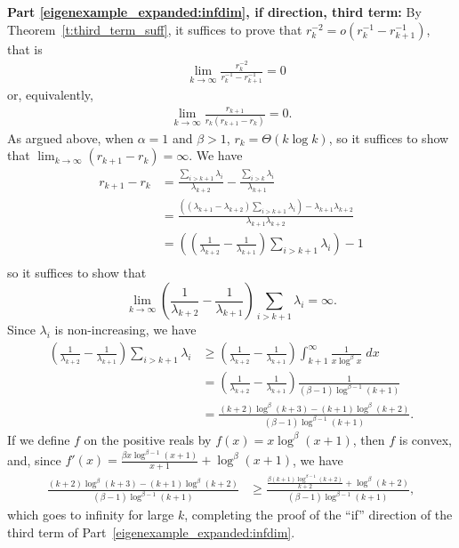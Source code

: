 \documentclass[11pt,notitlepage]{article}
\begin{document}
\noindent
{\bf Part \ref{eigenexample_expanded:infdim}, if direction, third term:}  By Theorem~\ref{t:third_term_suff}, it suffices to
prove that $r_k^{-2} = o(r_k^{-1} - r_{k+1}^{-1})$, that is
\begin{align*}
& \lim_{k \rightarrow \infty} 
 \frac{r_k^{-2}}{r_k^{-1} - r_{k+1}^{-1}} = 0 
\end{align*}
or, equivalently,
\begin{align*}
    \lim_{k \rightarrow \infty} 
         \frac{r_{k+1}}{r_k (r_{k+1} - r_k)} = 0.
\end{align*}
As argued above, when $\alpha = 1$ and $\beta > 1$, $r_k = \Theta(k
\log k)$, so it suffices to show that $\lim_{k \rightarrow \infty}
(r_{k+1} - r_k) = \infty$.  We have
\begin{align*}
r_{k+1} - r_k 
 & = \frac{\sum_{i > k+1} \lambda_i}{\lambda_{k+2}}
      - \frac{\sum_{i > k} \lambda_i}{\lambda_{k+1}} \\
 & = \frac{\left( ( \lambda_{k+1} - \lambda_{k+2}) \sum_{i > k+1} \lambda_i \right)
           - \lambda_{k+1}\lambda_{k+2}}
          {\lambda_{k+1}\lambda_{k+2}}
       \\
 & = \left( \left( \frac{1}{\lambda_{k+2}} - \frac{1}{\lambda_{k+1}} \right)
         \sum_{i > k+1} \lambda_i \right)
      - 1 \\
\end{align*}
so it suffices to show that
\[
\lim_{k \rightarrow \infty}  \left( \frac{1}{\lambda_{k+2}} - \frac{1}{\lambda_{k+1}} \right)
         \sum_{i > k+1} \lambda_i = \infty.
\]
Since $\lambda_i$ is non-increasing, we have
\begin{align*}
\left( \frac{1}{\lambda_{k+2}} - \frac{1}{\lambda_{k+1}} \right)
         \sum_{i > k+1} \lambda_i 
& \geq \left( \frac{1}{\lambda_{k+2}} - \frac{1}{\lambda_{k+1}} \right)
         \int_{k+1}^{\infty} \frac{1}{x \log^{\beta} x} \; dx \\
& = \left( \frac{1}{\lambda_{k+2}} - \frac{1}{\lambda_{k+1}} \right)
         \frac{1}{(\beta - 1) \log^{\beta - 1} (k+1)} \\
& = \frac{(k+2) \log^{\beta} (k+3) - (k+1) \log^{\beta} (k+2)}
         {(\beta - 1) \log^{\beta - 1} (k+1)}.
\end{align*}
If we define $f$ on the positive reals by
$f(x) = x \log^{\beta} (x+1)$, then $f$ is 
convex, and, since 
$f'(x) = \frac{ \beta x \log^{\beta - 1} (x+1)}{x+1} + \log^{\beta} (x+1)$,
we have
\begin{align*}
\frac{(k+2) \log^{\beta} (k+3) - (k+1) \log^{\beta} (k+2)}
         {(\beta - 1) \log^{\beta - 1} (k+1)}
 & \geq 
   \frac{\frac{ \beta (k+1) \log^{\beta - 1} (k+2)}
              {k+2} 
          + \log^{\beta} (k+2)}
        {(\beta - 1) \log^{\beta - 1} (k+1)},
\end{align*}
which goes to infinity for large $k$, completing the proof of the
``if'' direction of the third term of Part~\ref{eigenexample_expanded:infdim}.
\end{document}
